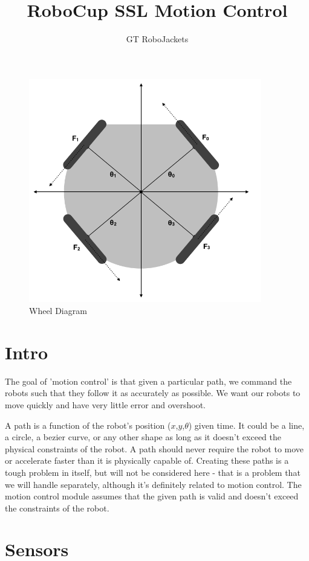 \documentclass{article}
\author{GT RoboJackets}
\title{RoboCup SSL Motion Control}
\begin{document}
\maketitle



\begin{figure}[p]
	\centering
	\includegraphics[width=4in]{WheelDiagram.png}
	\caption{Wheel Diagram}
	\label{fig:wheel_diagram}
\end{figure}


\section*{Intro}

The goal of 'motion control' is that given a particular path, we command the robots such that they follow it as accurately as possible.  We want our robots to move quickly and have very little error and overshoot.

A path is a function of the robot's position ($x$,$y$,$\theta$) given time.  It could be a line, a circle, a bezier curve, or any other shape as long as it doesn't exceed the physical constraints of the robot.  A path should never require the robot to move or accelerate faster than it is physically capable of.  Creating these paths is a tough problem in itself, but will not be considered here - that is a problem that we will handle separately, although it's definitely related to motion control.  The motion control module assumes that the given path is valid and doesn't exceed the constraints of the robot.


\section*{Sensors}
\end{document}
